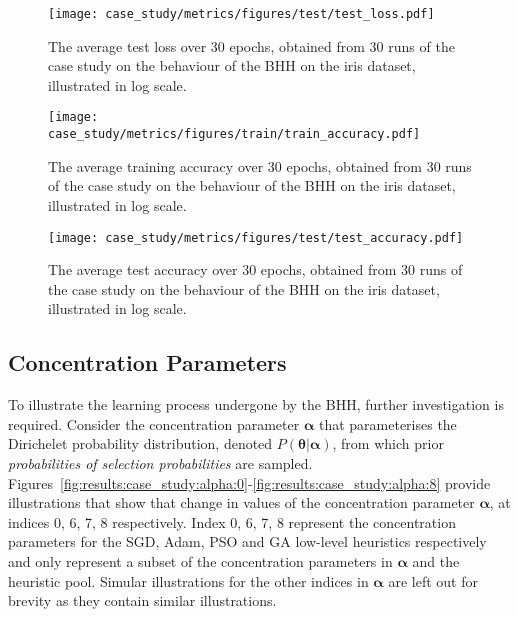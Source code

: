 \begin{figure}[htpb]
	\centering
	\texttt{[image: case\_study/metrics/figures/test/test\_loss.pdf]}
	\caption{The average test loss over 30 epochs, obtained from 30 runs of the case study on the behaviour of the \acs{BHH} on the iris dataset, illustrated in log scale.}
	\label{fig:results:case_study:test_loss}
\end{figure}

\begin{figure}[htpb]
	\centering
	\texttt{[image: case\_study/metrics/figures/train/train\_accuracy.pdf]}
	\caption{The average training accuracy over 30 epochs, obtained from 30 runs of the case study on the behaviour of the \acs{BHH} on the iris dataset, illustrated in log scale.}
	\label{fig:results:case_study:train_accuracy}
\end{figure}

\begin{figure}[htpb]
	\centering
	\texttt{[image: case\_study/metrics/figures/test/test\_accuracy.pdf]}
	\caption{The average test accuracy over 30 epochs, obtained from 30 runs of the case study on the behaviour of the \acs{BHH} on the iris dataset, illustrated in log scale.}
	\label{fig:results:case_study:test_accuracy}
\end{figure}



\subsection{Concentration Parameters}\label{sec:results:case_study:concentration_parameters}

To illustrate the learning process undergone by the \acs{BHH}, further investigation is required. Consider the concentration parameter $\boldsymbol{\alpha}$ that parameterises the Dirichelet probability distribution, denoted $P(\boldsymbol{\theta} \vert \boldsymbol{\alpha})$, from which prior \textit{probabilities of selection probabilities} are sampled. Figures~\ref{fig:results:case_study:alpha:0}-\ref{fig:results:case_study:alpha:8} provide illustrations that show that change in values of the concentration parameter $\boldsymbol{\alpha}$, at indices 0, 6, 7, 8 respectively. Index 0, 6, 7, 8 represent the concentration parameters for the \acs{SGD}, \acs{Adam}, \acs{PSO} and \acs{GA} low-level heuristics respectively and only represent a subset of the concentration parameters in $\boldsymbol{\alpha}$ and the heuristic pool. Simular illustrations for the other indices in $\boldsymbol{\alpha}$ are left out for brevity as they contain similar illustrations.

